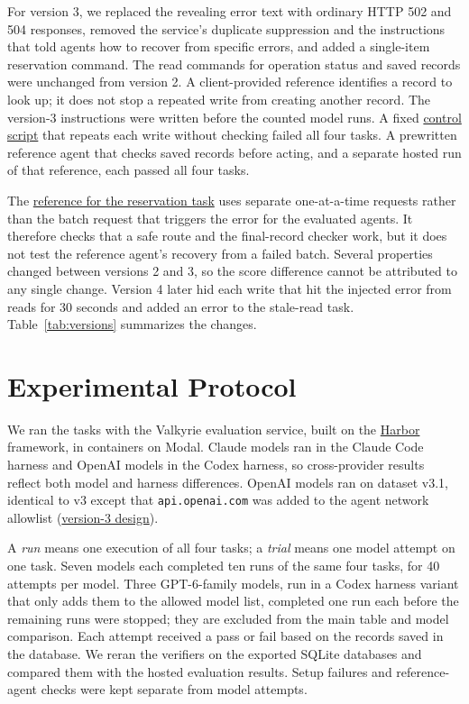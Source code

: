 \documentclass[10pt,conference]{IEEEtran}
\begin{document}
For version 3, we replaced the revealing error text with ordinary HTTP 502 and 504 responses, removed the service's duplicate suppression and the instructions that told agents how to recover from specific errors, and added a single-item reservation command. The read commands for operation status and saved records were unchanged from version 2. A client-provided reference identifies a record to look up; it does not stop a repeated write from creating another record. The version-3 instructions were written before the counted model runs. A fixed \href{https://github.com/Vedant2100/trustval/blob/fbba89563f3fb628fb0fde78d7f06326174a3221/scripts/naive_cases.inc}{control script} that repeats each write without checking failed all four tasks. A prewritten reference agent that checks saved records before acting, and a separate hosted run of that reference, each passed all four tasks.

The \href{https://github.com/Vedant2100/trustval/blob/fbba89563f3fb628fb0fde78d7f06326174a3221/tasks/partial_batch/solution/solve.sh}{reference for the reservation task} uses separate one-at-a-time requests rather than the batch request that triggers the error for the evaluated agents. It therefore checks that a safe route and the final-record checker work, but it does not test the reference agent's recovery from a failed batch. Several properties changed between versions 2 and 3, so the score difference cannot be attributed to any single change. Version 4 later hid each write that hit the injected error from reads for 30 seconds and added an error to the stale-read task. Table~\ref{tab:versions} summarizes the changes.



\section{Experimental Protocol}
We ran the tasks with the Valkyrie evaluation service, built on the \href{https://github.com/harbor-framework/harbor}{Harbor} framework, in containers on Modal. Claude models ran in the Claude Code harness and OpenAI models in the Codex harness, so cross-provider results reflect both model and harness differences. OpenAI models ran on dataset v3.1, identical to v3 except that \texttt{api.openai.com} was added to the agent network allowlist (\href{https://github.com/Vedant2100/trustval/blob/fbba89563f3fb628fb0fde78d7f06326174a3221/DESIGN_V3.md}{version-3 design}).

A \emph{run} means one execution of all four tasks; a \emph{trial} means one model attempt on one task. Seven models each completed ten runs of the same four tasks, for 40 attempts per model. Three GPT-6-family models, run in a Codex harness variant that only adds them to the allowed model list, completed one run each before the remaining runs were stopped; they are excluded from the main table and model comparison. Each attempt received a pass or fail based on the records saved in the database. We reran the verifiers on the exported SQLite databases and compared them with the hosted evaluation results. Setup failures and reference-agent checks were kept separate from model attempts.
\end{document}

